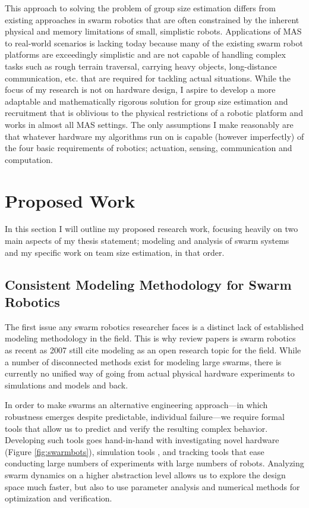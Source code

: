 \documentclass[11pt, onecolumn, compsoc, letterpaper]{article}
\begin{document}
This approach to solving the problem of group size estimation differs from existing approaches in swarm robotics that are often constrained by the inherent physical and memory limitations of small, simplistic robots. Applications of MAS to real-world scenarios is lacking today because many of the existing swarm robot platforms are exceedingly simplistic and are not capable of handling complex tasks such as rough terrain traversal, carrying heavy objects, long-distance communication, etc. that are required for tackling actual situations. While the focus of my research is not on hardware design, I aspire to develop a more adaptable and mathematically rigorous solution for group size estimation and recruitment that is oblivious to the physical restrictions of a robotic platform and works in almost all MAS settings. The only assumptions I make reasonably are that whatever hardware my algorithms run on is capable (however imperfectly) of the four basic requirements of robotics; actuation, sensing, communication and computation.

\section{Proposed Work}
In this section I will outline my proposed research work, focusing heavily on two main aspects of my thesis statement; modeling and analysis of swarm systems and my specific work on team size estimation, in that order.

\subsection{Consistent Modeling Methodology for Swarm Robotics}
The first issue any swarm robotics researcher faces is a distinct lack of established modeling methodology in the field.  This is why review papers is swarm robotics as recent as 2007 \cite{Bayindir2007} still cite modeling as an open research topic for the field. While a number of disconnected methods exist for modeling large swarms, there is currently no unified way of going from actual physical hardware experiments to simulations and models and back. 

In order to make swarms an alternative engineering approach---in which robustness emerges despite predictable, individual failure---we require formal tools that allow us to predict and verify the resulting complex behavior. Developing such tools goes hand-in-hand with investigating novel hardware (Figure \ref{fig:swarmbots}), simulation tools \cite{Michel1998}, and tracking tools \cite{correlliros06,lochmatter08} that ease conducting large numbers of experiments with large numbers of robots. Analyzing swarm dynamics on a higher abstraction level allows us to explore the design space much faster, but also to use parameter analysis and numerical methods for optimization and verification.
\end{document}
